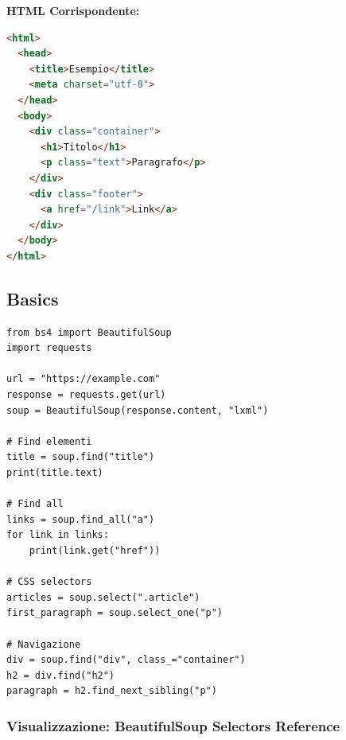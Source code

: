 \begin{center}
\textbf{HTML Corrispondente:}
\begin{lstlisting}[language=html, frame=single, basicstyle=\tiny\ttfamily]
<html>
  <head>
    <title>Esempio</title>
    <meta charset="utf-8">
  </head>
  <body>
    <div class="container">
      <h1>Titolo</h1>
      <p class="text">Paragrafo</p>
    </div>
    <div class="footer">
      <a href="/link">Link</a>
    </div>
  </body>
</html>
\end{lstlisting}
\end{center}

\subsection{Basics}

\begin{lstlisting}
from bs4 import BeautifulSoup
import requests

url = "https://example.com"
response = requests.get(url)
soup = BeautifulSoup(response.content, "lxml")

# Find elementi
title = soup.find("title")
print(title.text)

# Find all
links = soup.find_all("a")
for link in links:
    print(link.get("href"))

# CSS selectors
articles = soup.select(".article")
first_paragraph = soup.select_one("p")

# Navigazione
div = soup.find("div", class_="container")
h2 = div.find("h2")
paragraph = h2.find_next_sibling("p")
\end{lstlisting}

\subsubsection{Visualizzazione: BeautifulSoup Selectors Reference}

